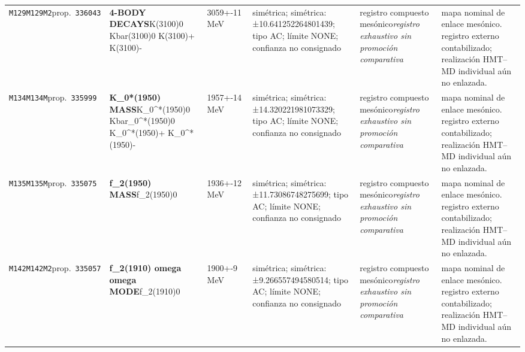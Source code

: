 \begin{landscape}
\begin{longtable}{L{1.85cm}L{4.45cm}L{2.35cm}L{4.05cm}L{3.35cm}L{7.15cm}}
\texttt{M129}\newline \texttt{M129M2}\newline prop.\ \texttt{336043} & \textbf{4-BODY DECAYS}\newline K(3100)0 \textbar{}\allowbreak{} Kbar(3100)0 \textbar{}\allowbreak{} K(3100)+ \textbar{}\allowbreak{} K(3100)- & 3059+-11\,MeV & simétrica; simétrica: ±10.641252264801439; tipo AC; límite NONE; confianza no consignado & registro compuesto mesónico\newline \emph{registro exhaustivo sin promoción comparativa} & mapa nominal de enlace mesónico. registro externo contabilizado; realización HMT--MD individual aún no enlazada. \\
\texttt{M134}\newline \texttt{M134M}\newline prop.\ \texttt{335999} & \textbf{K\_\allowbreak{}0*(1950) MASS}\newline K\_\allowbreak{}0\textasciicircum{}*(1950)0 \textbar{}\allowbreak{} Kbar\_\allowbreak{}0\textasciicircum{}*(1950)0 \textbar{}\allowbreak{} K\_\allowbreak{}0\textasciicircum{}*(1950)+ \textbar{}\allowbreak{} K\_\allowbreak{}0\textasciicircum{}*(1950)- & 1957+-14\,MeV & simétrica; simétrica: ±14.320221981073329; tipo AC; límite NONE; confianza no consignado & registro compuesto mesónico\newline \emph{registro exhaustivo sin promoción comparativa} & mapa nominal de enlace mesónico. registro externo contabilizado; realización HMT--MD individual aún no enlazada. \\
\texttt{M135}\newline \texttt{M135M}\newline prop.\ \texttt{335075} & \textbf{f\_\allowbreak{}2(1950) MASS}\newline f\_\allowbreak{}2(1950)0 & 1936+-12\,MeV & simétrica; simétrica: ±11.73086748275699; tipo AC; límite NONE; confianza no consignado & registro compuesto mesónico\newline \emph{registro exhaustivo sin promoción comparativa} & mapa nominal de enlace mesónico. registro externo contabilizado; realización HMT--MD individual aún no enlazada. \\
\texttt{M142}\newline \texttt{M142M2}\newline prop.\ \texttt{335057} & \textbf{f\_\allowbreak{}2(1910) omega omega MODE}\newline f\_\allowbreak{}2(1910)0 & 1900+-9\,MeV & simétrica; simétrica: ±9.266557494580514; tipo AC; límite NONE; confianza no consignado & registro compuesto mesónico\newline \emph{registro exhaustivo sin promoción comparativa} & mapa nominal de enlace mesónico. registro externo contabilizado; realización HMT--MD individual aún no enlazada. \\

\end{longtable}
\end{landscape}
